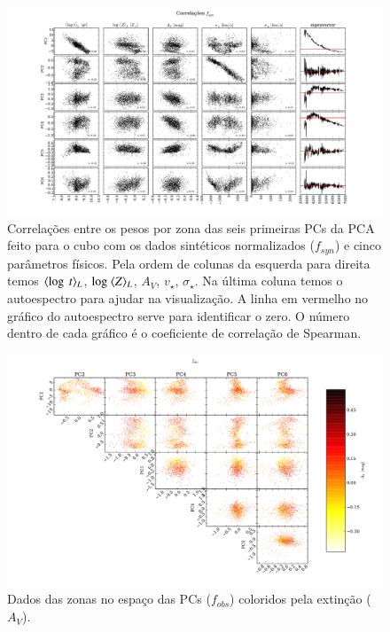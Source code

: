 \begin{figure}
    \includegraphics[width=1.2\textwidth, angle=-90]{figuras/K0277-correl-f_syn_norm-PCvsPhys.pdf}
	\caption[Correlações PCs vs. par\^ametros f\'isicos - $f_{syn}$.]
    {Correlações entre os pesos por zona das seis primeiras PCs da PCA feito para o cubo com os dados sintéticos
    normalizados ($f_{syn}$) e cinco parâmetros físicos. Pela ordem de colunas da esquerda para direita temos
    $\meanL{\log\ t}$, $\log\ \meanL{Z}$, $A_V$, $v_{\star}$, $\sigma_{\star}$. Na última coluna temos o autoespectro para ajudar na visualização.
    A linha em vermelho no gráfico do autoespectro serve para identificar o zero. O número dentro de cada gráfico é o
    coeficiente de correlação de Spearman.}
    \label{fig:K0277correfsynorm}
\end{figure}

\begin{figure}
	\includegraphics[width=1.3\textwidth, angle=-90]{figuras/K0277-f_obs_norm-corre_PCxPC_AV.pdf}
	\caption[Dados no espaço das PCs vs AV- $f_{obs}$.]
    {Dados das zonas no espaço das PCs ($f_{obs}$) coloridos pela extinção ($A_V$).}
    \label{fig:K0277correfobsnormPCvsPC:AV}	
\end{figure}

